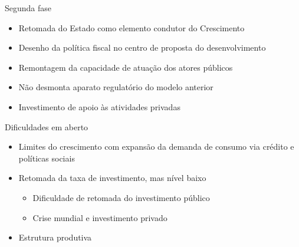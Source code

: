 \documentclass[presentation]{beamer}
\begin{document}
\begin{frame}[label={sec:org5c45f1e}]{Segunda fase}
\begin{itemize}
\item Retomada do Estado como elemento condutor do Crescimento
\item Desenho da política fiscal no centro de proposta do desenvolvimento
\item Remontagem da capacidade de atuação dos atores públicos
\item Não desmonta aparato regulatório do modelo anterior
\item Investimento de apoio às atividades privadas
\end{itemize}
\end{frame}


\begin{frame}[label={sec:org18bf49b}]{Dificuldades em aberto \cite{melloIndustrialismoAusteridadePolitica}}
\begin{itemize}
\item Limites do crescimento com expansão da demanda de consumo via crédito e políticas sociais
\item Retomada da taxa de investimento, mas nível baixo
\begin{itemize}
\item Dificuldade de retomada do investimento público
\item Crise mundial e investimento privado
\end{itemize}
\item Estrutura produtiva
\end{itemize}
\end{frame}
\end{document}
